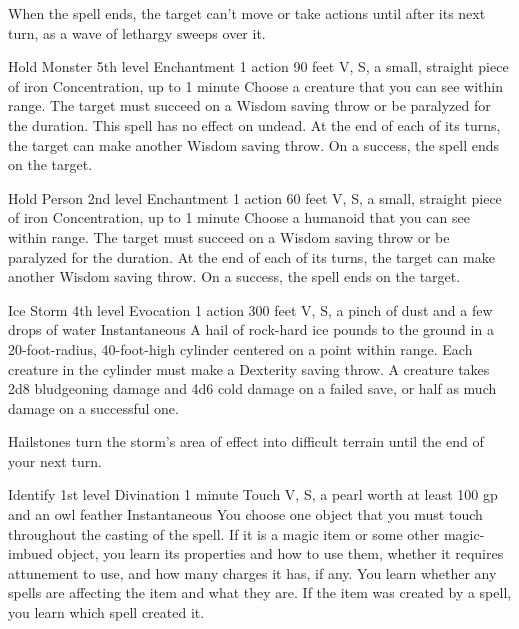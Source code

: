 \documentclass[10pt,a4paper,twoside,bg=print,twocolumn,openany,nodeprecatedcode]{dndbook}
\begin{document}
When the spell ends, the target can't move or take actions until after its next turn, as a wave of lethargy sweeps over it.



\DndSpellHeader%
{Hold Monster}
{5th level Enchantment}
{1 action}
{90 feet}
{V, S, a small, straight piece of iron}
{Concentration, up to 1 minute}
Choose a creature that you can see within range. The target must succeed on a Wisdom saving throw or be paralyzed for the duration. This spell has no effect on undead. At the end of each of its turns, the target can make another Wisdom saving throw. On a success, the spell ends on the target.



\DndSpellHeader%
{Hold Person}
{2nd level Enchantment}
{1 action}
{60 feet}
{V, S, a small, straight piece of iron}
{Concentration, up to 1 minute}
Choose a humanoid that you can see within range. The target must succeed on a Wisdom saving throw or be paralyzed for the duration. At the end of each of its turns, the target can make another Wisdom saving throw. On a success, the spell ends on the target.



\DndSpellHeader%
{Ice Storm}
{4th level Evocation}
{1 action}
{300 feet}
{V, S, a pinch of dust and a few drops of water}
{Instantaneous}
A hail of rock-hard ice pounds to the ground in a 20-foot-radius, 40-foot-high cylinder centered on a point within range. Each creature in the cylinder must make a Dexterity saving throw. A creature takes 2d8 bludgeoning damage and 4d6 cold damage on a failed save, or half as much damage on a successful one.

Hailstones turn the storm's area of effect into difficult terrain until the end of your next turn.



\DndSpellHeader%
{Identify}
{1st level Divination}
{1 minute}
{Touch}
{V, S, a pearl worth at least 100 gp and an owl feather}
{Instantaneous}
You choose one object that you must touch throughout the casting of the spell. If it is a magic item or some other magic-imbued object, you learn its properties and how to use them, whether it requires attunement to use, and how many charges it has, if any. You learn whether any spells are affecting the item and what they are. If the item was created by a spell, you learn which spell created it.
\end{document}
